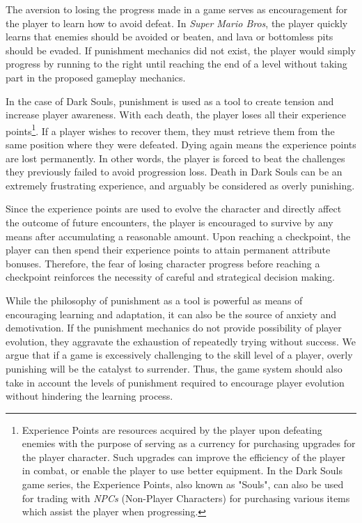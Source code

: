 The aversion to losing the progress made in a game serves as encouragement for the player to learn how to avoid defeat. In \emph{Super Mario Bros}, the player quickly learns that enemies should be avoided or beaten, and lava or bottomless pits should be evaded. If punishment mechanics did not exist, the player would simply progress by running to the right until reaching the end of a level without taking part in the proposed gameplay mechanics.

In the case of Dark Souls, punishment is used as a tool to create tension and increase player awareness. With each death, the player loses all their experience points\footnote{Experience Points are resources acquired by the player upon defeating enemies with the purpose of serving as a currency for purchasing upgrades for the player character. Such upgrades can improve the efficiency of the player in combat, or enable the player to use better equipment. In the Dark Souls game series, the Experience Points, also known as "Souls", can also be used for trading with \emph{NPCs} (Non-Player Characters) for purchasing various items which assist the player when progressing.}. If a player wishes to recover them, they must retrieve them from the same position where they were defeated. Dying again means the experience points are lost permanently. In other words, the player is forced to beat the challenges they previously failed to avoid progression loss. Death in Dark Souls can be an extremely frustrating experience, and arguably be considered as overly punishing.

Since the experience points are used to evolve the character and directly affect the outcome of future encounters, the player is encouraged to survive by any means after accumulating a reasonable amount. Upon reaching a checkpoint, the player can then spend their experience points to attain permanent attribute bonuses. Therefore, the fear of losing character progress before reaching a checkpoint reinforces the necessity of careful and strategical decision making.

While the philosophy of punishment as a tool is powerful as means of encouraging learning and adaptation, it can also be the source of anxiety and demotivation. If the punishment mechanics do not provide possibility of player evolution, they aggravate the exhaustion of repeatedly trying without success. We argue that if a game is excessively challenging to the skill level of a player, overly punishing will be the catalyst to surrender. Thus, the game system should also take in account the levels of punishment required to encourage player evolution without hindering the learning process.

